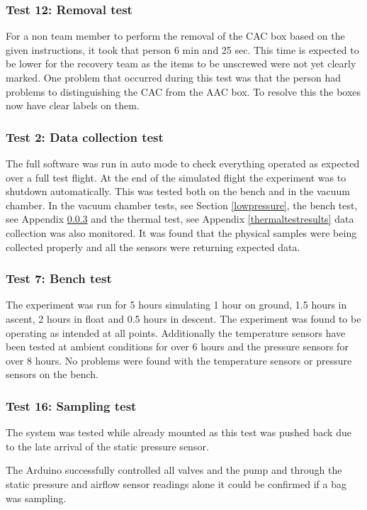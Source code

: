 \documentclass[a4paper,12pt,oneside]{article}
\begin{document}
\subsubsection{Test 12: Removal test}
For a non team member to perform the removal of the CAC box based on the given instructions, it took that person 6 min and 25 sec. This time is expected to be lower for the recovery team as the items to be unscrewed were not yet clearly marked. One problem that occurred during this test was that the person had problems to distinguishing the CAC from the AAC box. To resolve this the boxes now have clear labels on them.

\subsubsection{Test 2: Data collection test}
The full software was run in auto mode to check everything operated as expected over a full test flight. At the end of the simulated flight the experiment was to shutdown automatically. This was tested both on the bench and in the vacuum chamber. In the vacuum chamber tests, see Section \ref{lowpressure}, the bench test, see Appendix \ref{benchtest} and the thermal test, see Appendix \ref{thermaltestresults} data collection was also monitored. It was found that the physical samples were being collected properly and all the sensors were returning expected data.


\subsubsection{Test 7: Bench test}\label{benchtest}
The experiment was run for 5 hours simulating 1 hour on ground, 1.5 hours in ascent, 2 hours in float and 0.5 hours in descent. The experiment was found to be operating as intended at all points. Additionally the temperature sensors have been tested at ambient conditions for over 6 hours and the pressure sensors for over 8 hours. No problems were found with the temperature sensors or pressure sensors on the bench. 

 

\subsubsection{Test 16: Sampling test}
The system was tested while already mounted as this test was pushed back due to the late arrival of the static pressure sensor.

The Arduino successfully controlled all valves and the pump and through the static pressure and airflow sensor readings alone it could be confirmed if a bag was sampling.
\end{document}
